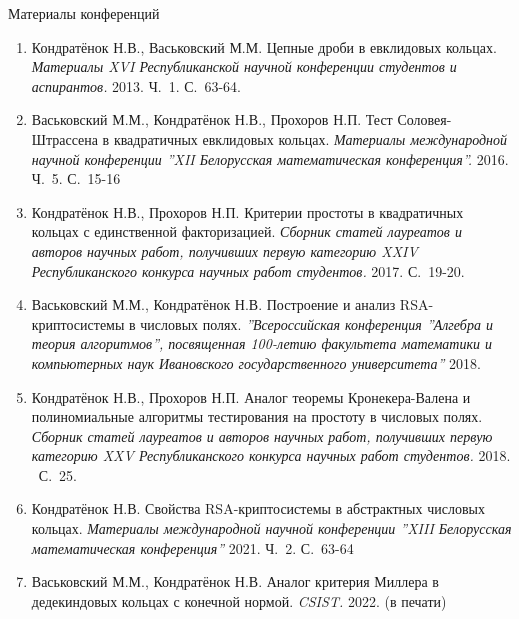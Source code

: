 \documentclass[8pt, xcolor=x11names]{beamer}
\begin{document}
\begin{frame}{Материалы конференций}
    \begin{small}
        \begin{enumerate}
            \item Кондратёнок Н.В., Васьковский М.М. Цепные дроби в евклидовых кольцах. {\it Материалы XVI Республиканской научной конференции студентов и аспирантов.} 2013. Ч.~1. С.~63-64.
            
            \item Васьковский М.М., Кондратёнок Н.В., Прохоров Н.П. Тест Соловея-Штрассена в квадратичных евклидовых кольцах. {\it Материалы международной научной конференции ''XII Белорусская математическая конференция''.} 2016. Ч.~5. С.~15-16
            
            \item Кондратёнок Н.В., Прохоров Н.П. Критерии простоты в квадратичных кольцах с единственной факторизацией. {\it Сборник статей лауреатов и авторов научных работ, получивших первую категорию XXIV Республиканского конкурса научных работ студентов.} 2017. С.~19-20.
            
            \item Васьковский М.М., Кондратёнок Н.В. Построение и анализ RSA-криптосистемы в числовых полях. {\it ''Всероссийская конференция ''Алгебра и теория алгоритмов'', посвященная 100-летию факультета математики и компьютерных наук Ивановского государственного университета''} 2018.
            
            \item Кондратёнок Н.В., Прохоров Н.П. Аналог теоремы Кронекера-Валена и полиномиальные алгоритмы тестирования на простоту в числовых полях. {\it Сборник статей лауреатов и авторов научных работ, получивших первую категорию XXV Республиканского конкурса научных работ студентов.} 2018. \textendash\ С.~25.
    
            \item Кондратёнок Н.В. Свойства RSA-криптосистемы в абстрактных числовых кольцах. {\it Материалы международной научной конференции ''XIII Белорусская математическая конференция''} 2021. Ч.~2. С.~63-64

            \item Васьковский М.М., Кондратёнок Н.В. Аналог критерия Миллера в дедекиндовых кольцах с конечной нормой. {\it CSIST.} 2022. (в печати)
        \end{enumerate}
    \end{small}
\end{frame}
\end{document}
